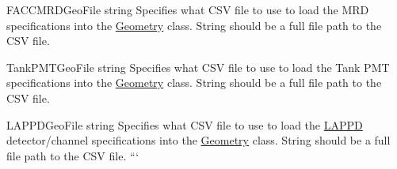 F\-A\-C\-C\-M\-R\-D\-Geo\-File string Specifies what C\-S\-V file to use to load the M\-R\-D specifications into the \hyperlink{classGeometry}{Geometry} class. String should be a full file path to the C\-S\-V file.

Tank\-P\-M\-T\-Geo\-File string Specifies what C\-S\-V file to use to load the Tank P\-M\-T specifications into the \hyperlink{classGeometry}{Geometry} class. String should be a full file path to the C\-S\-V file.

L\-A\-P\-P\-D\-Geo\-File string Specifies what C\-S\-V file to use to load the \hyperlink{classLAPPD}{L\-A\-P\-P\-D} detector/channel specifications into the \hyperlink{classGeometry}{Geometry} class. String should be a full file path to the C\-S\-V file. ``` 